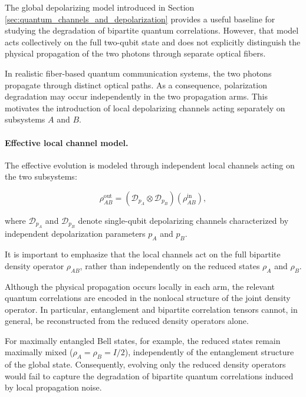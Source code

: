 The global depolarizing model introduced in Section \ref{sec:quantum_channels_and_depolarization} provides a useful baseline for studying the degradation of bipartite quantum correlations. However, that model acts collectively on the full two-qubit state and does not explicitly distinguish the physical propagation of the two photons through separate optical fibers.

\medskip

In realistic fiber-based quantum communication systems, the two photons propagate through distinct optical paths. As a consequence, polarization degradation may occur independently in the two propagation arms. This motivates the introduction of local depolarizing channels acting separately on subsystems \( A \) and \( B \).

\medskip

\paragraph{Effective local channel model.}

The effective evolution is modeled through independent local channels acting on the two subsystems:

\begin{equation}
\rho_{AB}^{\mathrm{out}}
=
\left(
\mathcal{D}_{p_A}
\otimes
\mathcal{D}_{p_B}
\right)
\left(
\rho_{AB}^{\mathrm{in}}
\right),
\label{eq:two_arm_local_channel_model}
\end{equation}

where \( \mathcal{D}_{p_A} \) and \( \mathcal{D}_{p_B} \) denote single-qubit depolarizing channels characterized by independent depolarization parameters \( p_A \) and \( p_B \).

\medskip

It is important to emphasize that the local channels act on the full bipartite density operator \( \rho_{AB} \), rather than independently on the reduced states \( \rho_A \) and \( \rho_B \).

\medskip

Although the physical propagation occurs locally in each arm, the relevant quantum correlations are encoded in the nonlocal structure of the joint density operator. In particular, entanglement and bipartite correlation tensors cannot, in general, be reconstructed from the reduced density operators alone.

\medskip

For maximally entangled Bell states, for example, the reduced states remain maximally mixed
(\( \rho_A = \rho_B = I/2 \)),
independently of the entanglement structure of the global state. Consequently, evolving only the reduced density operators would fail to capture the degradation of bipartite quantum correlations induced by local propagation noise.

